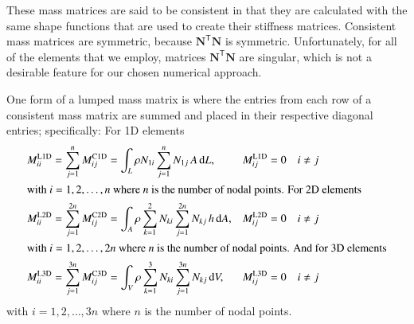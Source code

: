 These mass matrices are said to be consistent in that they are calculated with the same shape functions that are used to create their stiffness matrices.  Consistent mass matrices are symmetric, because $\mathbf{N}^{\mathsf{T}} \mathbf{N}$ is symmetric.  Unfortunately, for all of the elements that we employ, matrices $\mathbf{N}^{\mathsf{T}} \mathbf{N}$ are singular, which is not a desirable feature for our chosen numerical approach.

One form of a lumped mass matrix is where the entries from each row of a consistent mass matrix are summed and placed in their respective diagonal entries; specifically: \cite{Reddy93} For 1D elements
\begin{subequations}
    \label{lumpedMassMatrix}
    \begin{align}
    M^{\mathrm{L1D}}_{ii} & = \sum_{j=1}^n M^{\mathrm{C1D}}_{ij} = \int_L \rho N_{1i} \sum_{j=1}^n N_{1j} \, A \, \mathrm{d}L , & 
    M^{\mathrm{L1D}}_{ij} & = 0 \quad i \neq j  
    \label{lumpedMassMatrix1D} \\
    \intertext{with $i = 1, 2, \ldots , n$ where $n$ is the number of nodal points. For 2D elements}
    M^{\mathrm{L2D}}_{ii} & = \sum_{j=1}^{2n} M^{\mathrm{C2D}}_{ij} = \int_A \rho \sum_{k=1}^2 N_{ki} \sum_{j=1}^{2n} N_{kj} \, h \, \mathrm{d} A , & 
    M^{\mathrm{L2D}}_{ij} & = 0 \quad i \neq j  
    \label{lumpedMassMatrix2D} \\
    \intertext{with $i = 1 , 2, \ldots , 2n$ where $n$ is the number of nodal points. And for 3D elements}
    M^{\mathrm{L3D}}_{ii} & = \sum_{j=1}^{3n} M^{\mathrm{C3D}}_{ij} = \int_V \rho \sum_{k=1}^3 N_{ki} \sum_{j=1}^{3n} N_{kj} \, \mathrm{d} V , & 
    M^{\mathrm{L3D}}_{ij} & = 0 \quad i \neq j  
    \label{lumpedMassMatrix3D}
    \end{align}
\end{subequations}
with $i = 1, 2, \ldots , 3n$ where $n$ is the number of nodal points. 

